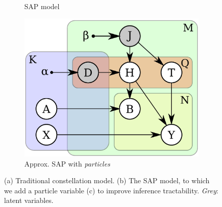 \begin{figure}[ht]
\begin{subfigure}[b]{0.33\linewidth}
	\caption{SAP model}	
	\label{fig:graphicalModelNoParticle}
\end{subfigure}
\begin{subfigure}[b]{0.33\linewidth}
	\includegraphics[width=\linewidth]{fig/3dreg/graphicalModelParticle.pdf}
	\caption{Approx. SAP with \emph{particles}}
	\label{fig:graphicalModelParticle}
\end{subfigure}
\caption{(a) Traditional constellation model. (b) The SAP model, to which we add a particle variable (c) to improve inference tractability. \emph{Grey}: latent variables.}
\label{fig:graphicalmodel}
\end{figure} 

